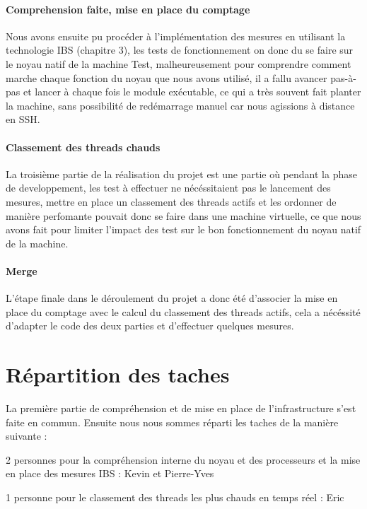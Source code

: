       \paragraph{Comprehension faite, mise en place du comptage}
        Nous avons ensuite pu procéder à l'implémentation des mesures en
        utilisant la technologie IBS (chapitre 3), les tests de fonctionnement
        on donc du se faire sur le noyau natif de la machine Test,
        malheureusement pour comprendre comment marche chaque fonction du noyau
        que nous avons utilisé, il a fallu avancer pas-à-pas et lancer à chaque
        fois le module exécutable, ce qui a très souvent fait planter la
        machine, sans possibilité de redémarrage manuel car nous agissions à
        distance en SSH.

      \paragraph{Classement des threads chauds}
        La troisième partie de la réalisation du projet est une partie où
        pendant la phase de developpement, les test à effectuer ne nécéssitaient
        pas le lancement des mesures, mettre en place un classement des threads
        actifs et les ordonner de manière perfomante pouvait donc se faire dans
        une machine virtuelle, ce que nous avons fait pour limiter l'impact des
        test sur le bon fonctionnement du noyau natif de la machine.

      \paragraph{Merge}
        L'étape finale dans le déroulement du projet a donc été d'associer la
        mise en place du comptage avec le calcul du classement des threads
        actifs, cela a nécéssité d'adapter le code des deux parties et
        d'effectuer quelques mesures.

  \section*{Répartition des taches}
    La première partie de compréhension et de mise en place de l'infrastructure
    s'est faite en commun. Ensuite nous nous sommes réparti les taches de la
    manière suivante :

    \bitem
      \item{2 personnes pour la compréhension interne du noyau et des
        processeurs et la mise en place des mesures IBS : Kevin et Pierre-Yves}
      \item{1 personne pour le classement des threads les plus chauds en temps
        réel : Eric}
    \eitem
